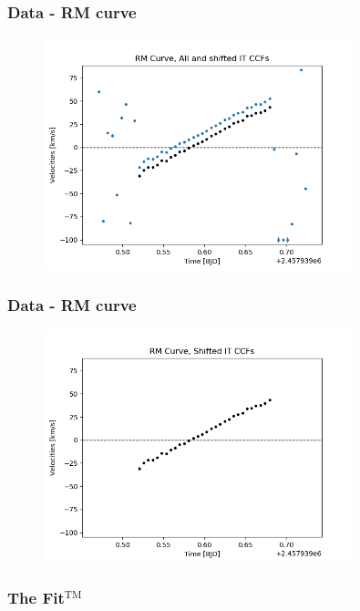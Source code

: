 \documentclass[show notes]{beamer}
\begin{document}
\begin{frame}
\frametitle{Data - RM curve}
\begin{figure}
	\centering
	\includegraphics[width=0.8\textwidth]{RM_all_shift.png}
	\label{fig:RM_all_shift}
\end{figure}
\end{frame}

\begin{frame}
\frametitle{Data - RM curve}
\begin{figure}
	\centering
	\includegraphics[width=0.8\textwidth]{RM_shift.png}
	\label{fig:RM_shift}
\end{figure}
\end{frame}

\begin{frame}
\frametitle{The Fit$ ^{\text{TM}} $}
\end{frame}
\end{document}
